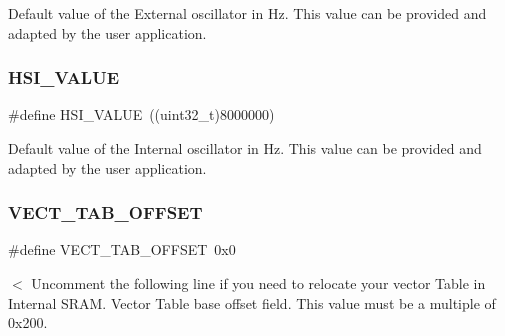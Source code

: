 Default value of the External oscillator in Hz. This value can be provided and adapted by the user application. \mbox{\label{group___s_t_m32_f3xx___system___private___defines_gaaa8c76e274d0f6dd2cefb5d0b17fbc37}} 
\subsubsection{\texorpdfstring{HSI\_VALUE}{HSI\_VALUE}}
{\footnotesize\ttfamily \#define H\+S\+I\+\_\+\+V\+A\+L\+UE~((uint32\+\_\+t)8000000)}

Default value of the Internal oscillator in Hz. This value can be provided and adapted by the user application. \mbox{\label{group___s_t_m32_f3xx___system___private___defines_ga40e1495541cbb4acbe3f1819bd87a9fe}} 
\subsubsection{\texorpdfstring{VECT\_TAB\_OFFSET}{VECT\_TAB\_OFFSET}}
{\footnotesize\ttfamily \#define V\+E\+C\+T\+\_\+\+T\+A\+B\+\_\+\+O\+F\+F\+S\+ET~0x0}

$<$ Uncomment the following line if you need to relocate your vector Table in Internal S\+R\+AM. Vector Table base offset field. This value must be a multiple of 0x200. 